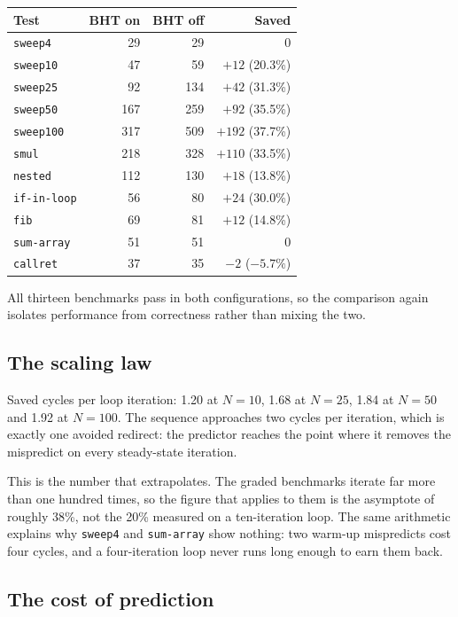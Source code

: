 \documentclass[11pt]{article}
\begin{document}
\begin{center}
\begin{tabular}{lrrr}
\hline
Test & BHT on & BHT off & Saved \\
\hline
\texttt{sweep4}     &  29 &  29 & 0 \\
\texttt{sweep10}    &  47 &  59 & $+12$ (20.3\%) \\
\texttt{sweep25}    &  92 & 134 & $+42$ (31.3\%) \\
\texttt{sweep50}    & 167 & 259 & $+92$ (35.5\%) \\
\texttt{sweep100}   & 317 & 509 & $+192$ (37.7\%) \\
\texttt{smul}       & 218 & 328 & $+110$ (33.5\%) \\
\texttt{nested}     & 112 & 130 & $+18$ (13.8\%) \\
\texttt{if-in-loop} &  56 &  80 & $+24$ (30.0\%) \\
\texttt{fib}        &  69 &  81 & $+12$ (14.8\%) \\
\texttt{sum-array}  &  51 &  51 & 0 \\
\texttt{callret}    &  37 &  35 & $-2$ ($-5.7\%$) \\
\hline
\end{tabular}
\end{center}

All thirteen benchmarks pass in both configurations, so the comparison again isolates
performance from correctness rather than mixing the two.

\subsection{The scaling law}

Saved cycles per loop iteration: 1.20 at $N=10$, 1.68 at $N=25$, 1.84 at $N=50$ and 1.92
at $N=100$. The sequence approaches two cycles per iteration, which is exactly one
avoided redirect: the predictor reaches the point where it removes the mispredict on
every steady-state iteration.

This is the number that extrapolates. The graded benchmarks iterate far more than one
hundred times, so the figure that applies to them is the asymptote of roughly 38\%, not
the 20\% measured on a ten-iteration loop. The same arithmetic explains why
\texttt{sweep4} and \texttt{sum-array} show nothing: two warm-up mispredicts cost four
cycles, and a four-iteration loop never runs long enough to earn them back.

\subsection{The cost of prediction}
\end{document}
